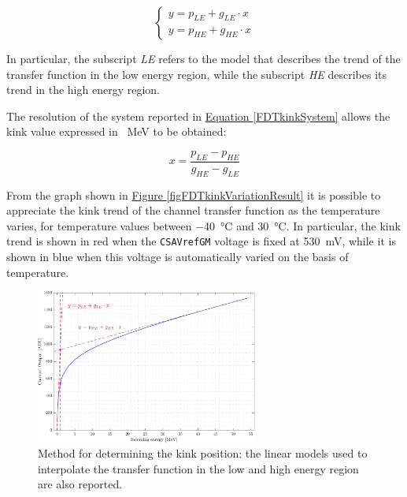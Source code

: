 \begin{equation}
    \begin{cases}
        y = p_{LE} + g_{LE} \cdot x \\
        y = p_{HE} + g_{HE} \cdot x
    \end{cases}
    \label{FDTkinkSystem}
\end{equation}

\noindent
In particular, the subscript \textit{LE} refers to the model that describes the trend of the transfer function in the low energy region, while the subscript \textit{HE} describes its trend in the high energy region. 

\par
The resolution of the system reported in \hyperref[FDTkinkSystem]{Equation \ref{FDTkinkSystem}} allows the kink value expressed in \SI{}{\mega\electronvolt} to be obtained:

\begin{equation}
    x = \frac{p_{LE} - p_{HE}}{g_{HE} - g_{LE}}
\end{equation}

\par
From the graph shown in \hyperref[figFDTkinkVariationResult]{Figure \ref{figFDTkinkVariationResult}} it is possible to appreciate the kink trend of the channel transfer function as the temperature varies, for temperature values between \SI{-40}{\celsius} and \SI{30}{\celsius}. In particular, the kink trend is shown in red when the \texttt{CSAVrefGM} voltage is fixed at \SI{530}{\milli\volt}, while it is shown in blue when this voltage is automatically varied on the basis of temperature.

\begin{figure}[h!]
    \centering
    \includegraphics[width=0.65\textwidth]{Images/chap1/results/FDT/fdt_calcolo_kink.pdf}
    \caption{Method for determining the kink position: the linear models used to interpolate the transfer function in the low and high energy region are also reported.}
    \label{figFDTkinkVariation}
\end{figure}

